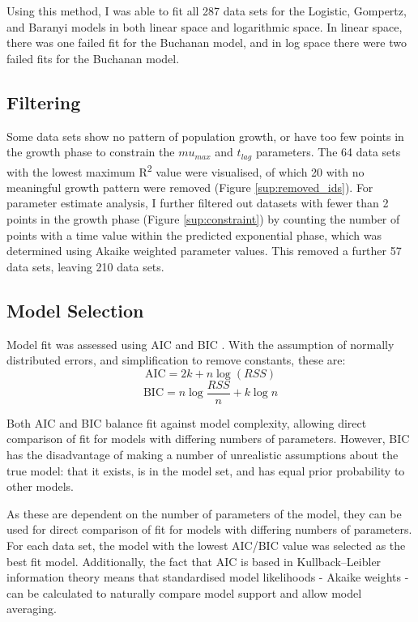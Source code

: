 \documentclass[11pt, a4paper]{article}
\begin{document}
\begin{linenumbers}
Using this method, I was able to fit all 287 data sets for the Logistic, Gompertz, and Baranyi models in both linear space and logarithmic space. In linear space, there was one failed fit for the Buchanan model, and in log space there were two failed fits for the Buchanan model.


\subsection{Filtering}
Some data sets show no pattern of population growth, or have too few points in the growth phase to constrain the $mu_{max}$ and $t_{lag}$ parameters. The 64 data sets with the lowest maximum R\textsuperscript{2} value were visualised, of which 20 with no meaningful growth pattern were removed (Figure \ref{sup:removed_ids}). For parameter estimate analysis, I further filtered out datasets with fewer than 2 points in the growth phase (Figure \ref{sup:constraint}) by counting the number of points with a time value within the predicted exponential phase, which was determined using Akaike weighted parameter values. This removed a further 57 data sets, leaving 210 data sets.


\subsection{Model Selection}

Model fit was assessed using AIC \cite{AIC} and BIC \cite{BIC}. With the assumption of normally distributed errors, and simplification to remove constants, these are:
\[\text {AIC}  = 2k + n\log(RSS)\]
\[\text {BIC} = n\log{\frac{RSS}{n}} + k\log{n}\]


Both AIC and BIC balance fit against model complexity, allowing direct comparison of fit for models with differing numbers of parameters. However, BIC has the disadvantage of making a number of unrealistic assumptions about the true model: that it exists, is in the model set, and has equal prior probability to other models.

 As these are dependent on the number of parameters of the model, they can be used for direct comparison of fit for models with differing numbers of parameters. For each data set, the model with the lowest AIC/BIC value was selected as the best fit model. Additionally, the fact that AIC is based in Kullback–Leibler information theory means that standardised model likelihoods - Akaike weights - can be calculated to naturally compare model support and allow model averaging.



\end{linenumbers}
\end{document}
